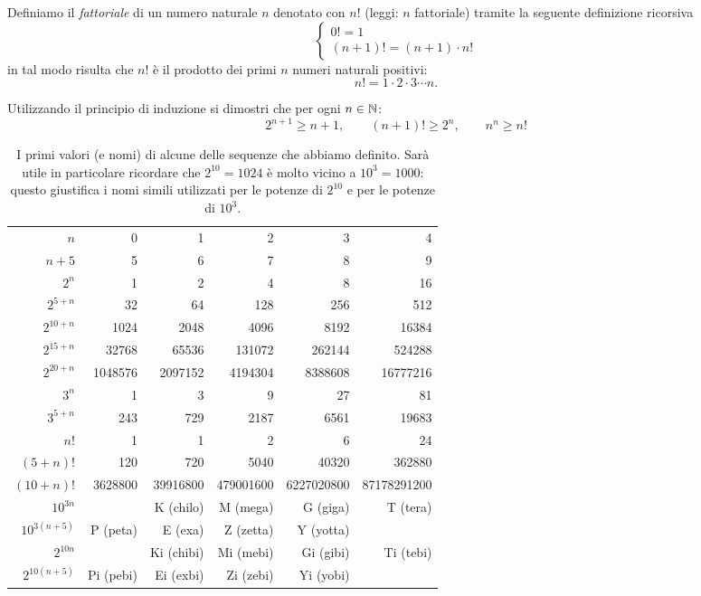 Definiamo il 
\emph{fattoriale}%
%
%
%
di un numero naturale $n$
denotato con $n!$ (leggi: $n$ fattoriale) 
tramite la seguente definizione ricorsiva
\[
  \begin{cases}
    0! = 1 \\
    (n+1)! = (n+1) \cdot n!
  \end{cases}
\]
in tal modo risulta che $n!$ è il prodotto dei primi $n$ numeri naturali positivi:
\[
  n! = 1 \cdot 2 \cdot 3 \cdots n.  
\]

\begin{exercise}
  \label{ex:6734098}%
  Utilizzando il principio di induzione
  si dimostri che per ogni $n\in {\mathbb N}$:
  \[
    2^{n+1} \ge n+1, \qquad
    (n+1)! \ge 2^n, \qquad
    n^n \ge n!
  \]
\end{exercise}

\begin{table}
  \begin{center}
  \begin{tabular}{r|>{\small}r>{\small}r>{\small}r>{\small}r>{\small}r}
  $n$       & 0 & 1 & 2 & 3 & 4 \\
  \footnotesize $n+5$     & 5 & 6 & 7 & 8 & 9 \\ \hline
  $2^n$     & 1 & 2 & 4 & 8 & 16 \\
  \footnotesize $2^{5+n}$ & 32 & 64 & 128 & 256 & 512 \\
  \footnotesize $2^{10+n}$ & 1024 & 2048 & 4096 & 8192 & 16384 \\
  \footnotesize $2^{15+n}$ & 32768 & 65536 & 131072 & 262144 & 524288 \\
  \footnotesize $2^{20+n}$ & 1048576 & 2097152 & 4194304 & 8388608 & 16777216 \\  \hline
  $3^n$                    & 1 & 3 & 9 & 27 & 81 \\
  \footnotesize $3^{5+n}$  & 243 & 729 & 2187 & 6561 & 19683 \\  \hline
  $n!$      & 1 & 1 & 2 & 6 & 24 \\
  \footnotesize $(5+n)!$  & 120 & 720 & 5040 & 40320 & 362880 \\
  \footnotesize $(10+n)!$  & 3628800 & 39916800 & 479001600 & 6227020800 & 87178291200 \\ \hline
  \footnotesize $10^{3n}$  &  & K (chilo) & M (mega) & G (giga) & T (tera) \\ 
  \footnotesize $10^{3(n+5)}$  & P (peta) & E (exa) & Z (zetta) & Y (yotta) \\ \hline
  \footnotesize $2^{10n}$  &  & Ki (chibi) & Mi (mebi) & Gi (gibi) & Ti (tebi) \\
  \footnotesize $2^{10(n+5)}$ & Pi (pebi)& Ei (exbi) & Zi (zebi) & Yi (yobi)
  \end{tabular}
  \end{center}
  \caption{I primi valori (e nomi) di alcune delle sequenze che abbiamo definito.
  Sarà utile in particolare ricordare che  $2^{10}=1024$ 
  è molto vicino a $10^3=1000$: questo giustifica i nomi simili utilizzati
  per le potenze di $2^{10}$ e per le potenze di $10^3$.
  }
  \end{table}
  
